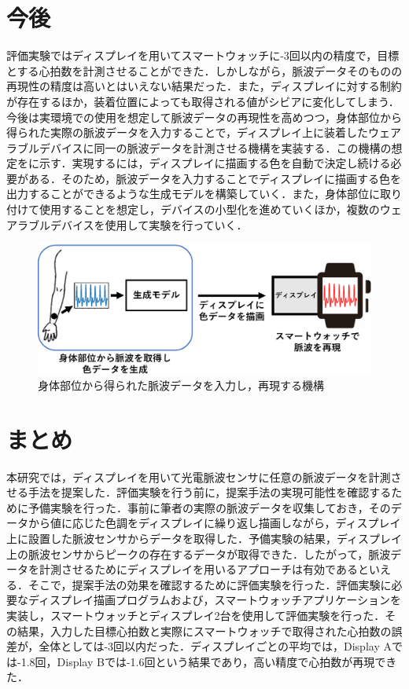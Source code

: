 \documentclass[Japanese,noauthor]{dicomopapers}
\begin{document}
\section{今後}
\label{sec:future_work}
評価実験ではディスプレイを用いてスマートウォッチに-3回以内の精度で，目標とする心拍数を計測させることができた．しかしながら，脈波データそのものの再現性の精度は高いとはいえない結果だった．また，ディスプレイに対する制約が存在するほか，装着位置によっても取得される値がシビアに変化してしまう．今後は実環境での使用を想定して脈波データの再現性を高めつつ，身体部位から得られた実際の脈波データを入力することで，ディスプレイ上に装着したウェアラブルデバイスに同一の脈波データを計測させる機構を実装する．この機構の想定をに示す．実現するには，ディスプレイに描画する色を自動で決定し続ける必要がある．そのため，脈波データを入力することでディスプレイに描画する色を出力することができるような生成モデルを構築していく．また，身体部位に取り付けて使用することを想定し，デバイスの小型化を進めていくほか，複数のウェアラブルデバイスを使用して実験を行っていく．

\begin{figure}[!t]
  \begin{center}
    \includegraphics[width=1\linewidth]{figures/future_work.eps}
  \end{center}
  \caption{身体部位から得られた脈波データを入力し，再現する機構}
  \label{fig:future_work}
\end{figure}



\section{まとめ}
\label{sec:conclude}
本研究では，ディスプレイを用いて光電脈波センサに任意の脈波データを計測させる手法を提案した．評価実験を行う前に，提案手法の実現可能性を確認するために予備実験を行った．事前に筆者の実際の脈波データを収集しておき，そのデータから値に応じた色調をディスプレイに繰り返し描画しながら，ディスプレイ上に設置した脈波センサからデータを取得した．予備実験の結果，ディスプレイ上の脈波センサからピークの存在するデータが取得できた．したがって，脈波データを計測させるためにディスプレイを用いるアプローチは有効であるといえる．そこで，提案手法の効果を確認するために評価実験を行った．評価実験に必要なディスプレイ描画プログラムおよび，スマートウォッチアプリケーションを実装し，スマートウォッチとディスプレイ2台を使用して評価実験を行った．その結果，入力した目標心拍数と実際にスマートウォッチで取得された心拍数の誤差が，全体としては-3回以内だった．ディスプレイごとの平均では，Display Aでは-1.8回，Display Bでは-1.6回という結果であり，高い精度で心拍数が再現できた．\par
\end{document}
